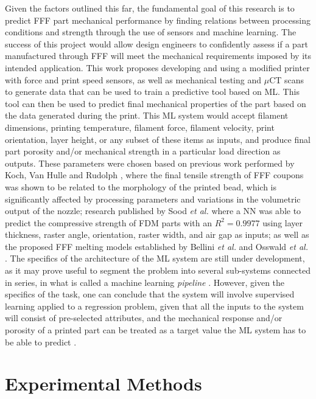 \documentclass[main.tex]{subfiles}
\begin{document}
Given the factors outlined this far, the fundamental goal of this research is to predict FFF part mechanical performance by finding relations between processing conditions and strength through the use of sensors and machine learning. The success of this project would allow design engineers to confidently assess if a part manufactured through FFF will meet the mechanical requirements imposed by its intended application. This work proposes developing and using a modified printer with force and print speed sensors, as well as mechanical testing and $\mu$CT scans to generate data that can be used to train a predictive tool based on ML. This tool can then be used to predict final mechanical properties of the part based on the data generated during the print. This ML system would accept filament dimensions, printing temperature, filament force, filament velocity, print orientation, layer height, or any subset of these items as inputs, and produce final part porosity and/or mechanical strength in a particular load direction as outputs. These parameters were chosen based on previous work performed by Koch, Van Hulle and Rudolph \cite{Koch2017}, where the final tensile strength of FFF coupons was shown to be related to the morphology of the printed bead, which is significantly affected by processing parameters and variations in the volumetric output of the nozzle; research published by Sood \emph{et al.} \cite{Sood2012} where a NN was able to predict the compressive strength of FDM parts with an $R^2= 0.9977$ using layer thickness, raster angle, orientation, raster width, and air gap as inputs; as well as the proposed FFF melting models established by Bellini \emph{et al.} \cite{Bellini2004} and Osswald \emph{et al.} \cite{OsswaldMelting18}. The specifics of the architecture of the ML system are still under development, as it may prove useful to segment the problem into several sub-systems connected in series, in what is called a machine learning \emph{pipeline} \cite{Geron2019}. However, given the specifics of the task, one can conclude that the system will involve supervised learning applied to a regression problem, given that all the inputs to the system will consist of pre-selected attributes, and the mechanical response and/or porosity of a printed part can be treated as a target value the ML system has to be able to predict \cite{Mohammed2017, Meng2020}.


\section{Experimental Methods} \label{sec:ml_meth}
\end{document}
